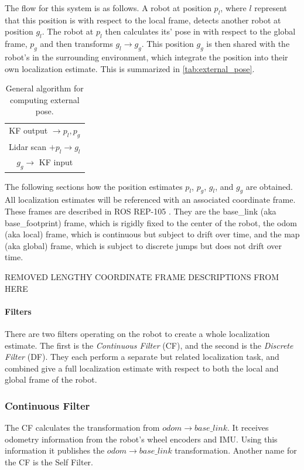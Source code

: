 \documentclass[conference]{IEEEtran}
\begin{document}
The flow for this system is as follows. A robot at position $p_l$, where $l$ represent that this position is with respect to the local frame, detects another robot at position $g_l$. The robot at $p_l$ then calculates its' pose in with respect to the global frame, $p_g$ and then transforms $g_l \rightarrow g_g$. This position $g_g$ is then shared with the robot's in the surrounding environment, which integrate the position into their own localization estimate. This is summarized in \autoref{tab:external_pose}.

\begin{table}
\centering
\begin{tabular}{c}
KF output $\rightarrow p_l, p_g$ \\
Lidar scan $+ p_l \rightarrow g_l$ \\
$g_g \rightarrow$ KF input
\end{tabular}
\caption{General algorithm for computing external pose.}
\label{tab:external_pose}
\end{table}

The following sections how the position estimates $p_l$, $p_g$, $g_l$, and $g_g$ are obtained. All localization estimates will be referenced with an associated coordinate frame. These frames are described in ROS REP-105 \cite{REP_105}. They are the base\_link (aka base\_footprint) frame, which is rigidly fixed to the center of the robot, the odom (aka local) frame, which is continuous but subject to drift over time, and the map (aka global) frame, which is subject to discrete jumps but does not drift over time.

REMOVED LENGTHY COORDINATE FRAME DESCRIPTIONS FROM HERE
 
\paragraph{Filters}
There are two filters operating on the robot to create a whole localization estimate. The first is the \textit{Continuous Filter} (CF), and the second is the \textit{Discrete Filter} (DF). They each perform a separate but related localization task, and combined give a full localization estimate with respect to both the local and global frame of the robot. 

\subsubsection{Continuous Filter} \label{con_filter_subsubsection}
The CF calculates the transformation from $odom \rightarrow base\_link$. It receives odometry information from the robot's wheel encoders and IMU. Using this information it publishes the $odom \rightarrow base\_link$ transformation. Another name for the CF is the Self Filter.  
\end{document}
